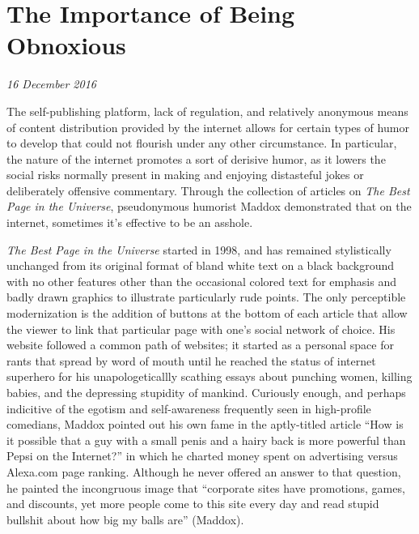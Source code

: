 \section{The Importance of Being Obnoxious}

\textit{16 December 2016}


The self-publishing platform, lack of regulation, and relatively anonymous means
of content distribution provided by the internet allows for certain types of
humor to develop that could not flourish under any other circumstance. In
particular, the nature of the internet promotes a sort of derisive humor, as it
lowers the social risks normally present in making and enjoying distasteful
jokes or deliberately offensive commentary. Through the collection of articles
on \textit{The Best Page in the Universe}, pseudonymous humorist Maddox
demonstrated that on the internet, sometimes it's effective to be an asshole.

\textit{The Best Page in the Universe} started in 1998, and has remained
stylistically unchanged from its original format of bland white text on a black
background with no other features other than the occasional colored text for
emphasis and badly drawn graphics to illustrate particularly rude points. The
only perceptible modernization is the addition of buttons at the bottom of each
article that allow the viewer to link that particular page with one's social
network of choice. His website followed a common path of websites; it started as
a personal space for rants that spread by word of mouth until he reached the
status of internet superhero for his unapologeticallly scathing essays about
punching women, killing babies, and the depressing stupidity of mankind.
Curiously enough, and perhaps indicitive of the egotism and self-awareness
frequently seen in high-profile comedians, Maddox pointed out his own fame in
the aptly-titled article ``How is it possible that a guy with a small penis and
a hairy back is more powerful than Pepsi on the Internet?'' in which he charted
money spent on advertising versus Alexa.com page ranking. Although he never
offered an answer to that question, he painted the incongruous image that
``corporate sites have promotions, games, and discounts, yet more people come to
this site every day and read stupid bullshit about how big my balls are''
(Maddox).

